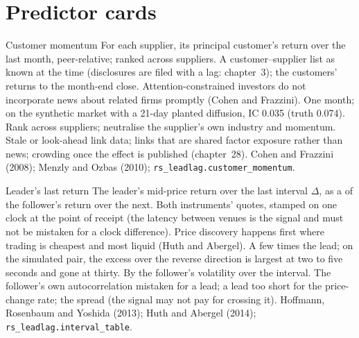 \section{Predictor cards}

\begin{predictorcard}{Customer momentum}\label{pred:rs:cross-sectional-and-cross-asset-features:customer}
 For each supplier, its principal customer's return over the last month, peer-relative; ranked across suppliers.
 A customer--supplier list as known at the time (disclosures are filed with a lag: chapter~3); the
customers' returns to the month-end close.
 Attention-constrained investors do not incorporate news about related firms promptly (Cohen and Frazzini).
 One month; on the synthetic market with a 21-day planted diffusion, IC 0.035 (truth 0.074).
 Rank across suppliers; neutralise the supplier's own industry and momentum.
 Stale or look-ahead link data; links that are shared factor exposure rather than news; crowding once the
effect is published (chapter~28).
 Cohen and Frazzini (2008); Menzly and Ozbas (2010); \texttt{rs\_leadlag.customer\_momentum}.
\end{predictorcard}

\begin{predictorcard}{Leader's last return}\label{pred:rs:cross-sectional-and-cross-asset-features:leader}
 The leader's mid-price return over the last interval $\Delta$, as a  of the follower's return over the next.
 Both instruments' quotes, stamped on one clock at the point of receipt (the latency between venues is the
signal and must not be mistaken for a clock difference).
 Price discovery happens first where trading is cheapest and most liquid (Huth and Abergel).
 A few times the lead; on the simulated pair, the excess over the reverse direction is largest at two to
five seconds and gone at thirty.
 By the follower's volatility over the interval.
 The follower's own autocorrelation mistaken for a lead; a lead too short for the price-change rate; the spread
(the signal may not pay for crossing it).
 Hoffmann, Rosenbaum and Yoshida (2013); Huth and Abergel (2014); \texttt{rs\_leadlag.interval\_table}.
\end{predictorcard}

